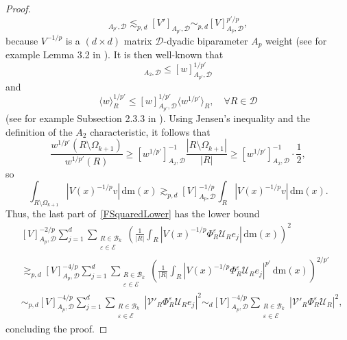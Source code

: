 \documentclass{article}
\theoremstyle{definition}
\theoremstyle{remark}
\numberwithin{equation}{section}
\newcommand{\mathdm}{\,\mathrm{dm}}
\newcommand{\cB}{\mathcal{B}}
\newcommand{\cE}{\mathcal{E}}
\newcommand{\cU}{\mathcal{U}}
\newcommand{\cV}{\mathcal{V}}
\newcommand{\bfD}{\bm{\mathcal{D}}}
\newcommand{\e}{\varepsilon}
\newcommand{\1}{\mathbf{1}}
\begin{document}
\begin{proof}
\begin{equation*}
            [w]_{A_{p'},\bfD}\lesssim_{p,d}[V']_{A_{p'},\bfD}\sim_{p,d}[V]_{A_p,\bfD}^{p'/p},
        \end{equation*}
        because $V^{-1/p}$ is a $(d\times d)$ matrix $\bfD$-dyadic biparameter $A_p$ weight (see for example Lemma 3.2 in \cite{DKPS2024}). It is then well-known that
        \begin{equation*}
            [w^{1/p'}]_{A_2,\bfD}\leq[w]_{A_{p'},\bfD}^{1/p'}
        \end{equation*}
        and
        \begin{equation*}
            \langle w\rangle_{R}^{1/p'}\leq[w]_{A_{p'},\bfD}^{1/p'}\langle w^{1/p'}\rangle_{R},\quad\forall R\in\bfD
        \end{equation*}
        (see for example Subsection 2.3.3 in \cite{Kakaroumpas_Soler_2022}). Using Jensen's inequality and the definition of the $A_2$ characteristic, it follows that
        \begin{equation*}
            \frac{w^{1/p'}(R\setminus\Omega_{k+1})}{w^{1/p'}(R)}\geq[w^{1/p'}]_{A_2,\bfD}^{-1}\frac{|R\setminus\Omega_{k+1}|}{|R|}\geq[w^{1/p'}]_{A_2,\bfD}^{-1}\cdot\frac{1}{2},
        \end{equation*}
        so
        \begin{equation*}
            \int_{R\setminus\Omega_{k+1}}|V(x)^{-1/p}v|\mathdm(x)\gtrsim_{p,d} [V]_{A_p,\bfD}^{-1/p}\int_{R}|V(x)^{-1/p}v|\mathdm(x).
        \end{equation*}
        Thus, the last part of~\eqref{FSquaredLower} has the lower bound
        \begin{align*}
            &[V]_{A_p,\bfD}^{-2/p}\sum_{j=1}^{d}\sum_{\substack{R\in\cB_k\\\e\in\cE}}\left(\frac{1}{|R|}\int_{R}|V(x)^{-1/p}\Phi_{R}^{\e}\cU_{R}e_{j}|\mathdm(x)\right)^2\\
            &\gtrsim_{p,d}[V]_{A_p,\bfD}^{-4/p}\sum_{j=1}^{d}\sum_{\substack{R\in\cB_k\\\e\in\cE}}\left(\frac{1}{|R|}\int_{R}|V(x)^{-1/p}\Phi_{R}^{\e}\cU_{R}e_{j}|^{p'}\mathdm(x)\right)^{2/p'}\\
            &\sim_{p,d}[V]_{A_p,\bfD}^{-4/p}\sum_{j=1}^{d}\sum_{\substack{R\in\cB_k\\\e\in\cE}}|\cV'_{R}\Phi_{R}^{\e}\cU_{R}e_{j}|^2\sim_{d}[V]_{A_p,\bfD}^{-4/p}\sum_{\substack{R\in\cB_k\\\e\in\cE}}|\cV'_{R}\Phi_{R}^{\e}\cU_{R}|^2,
        \end{align*}
        concluding the proof.
    \end{proof}
\end{document}
